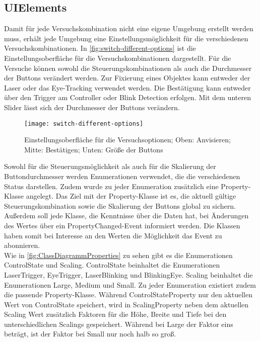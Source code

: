 \subsection{UIElements}
Damit für jede Versuchskombination nicht eine eigene Umgebung erstellt werden muss, erhält jede Umgebung eine Einstellungsmöglichkeit für die verschiedenen Versuchskombinationen. In \autoref{fig:switch-different-options} ist die Einstellungsoberfläche für die Versuchskombinationen dargestellt. Für die Versuche können sowohl die Steuerungskombinationen als auch die Durchmesser der Buttons verändert werden. Zur Fixierung eines Objektes kann entweder der Laser oder das Eye-Tracking verwendet werden. Die Bestätigung kann entweder über den Trigger am Controller oder Blink Detection erfolgen. Mit dem unteren Slider lässt sich der Durchmesser der Buttons verändern. 

\begin{figure}[!htbp]
	\centering
	\texttt{[image: switch-different-options]}
	\caption[Einstellungsoberfläche für die Versuchsoptionen]{Einstellungsoberfläche für die Versuchsoptionen; Oben: Anvisieren; Mitte: Bestätigen; Unten: Größe der Buttons}
	\label{fig:switch-different-options}
\end{figure}

Sowohl für die Steuerungsmöglichkeit als auch für die Skalierung der Buttondurchmesser werden Enumerationen verwendet, die die verschiedenen Status darstellen. Zudem wurde zu jeder Enumeration zusätzlich eine Property-Klasse angelegt. Das Ziel mit der Property-Klasse ist es, die aktuell gültige Steuerungskombination sowie die Skalierung der Buttons global zu sichern. Außerdem soll jede Klasse, die Kenntnisse über die Daten hat, bei Änderungen des Wertes über ein PropertyChanged-Event informiert werden. Die Klassen haben somit bei Interesse an den Werten die Möglichkeit das Event zu abonnieren. \\
Wie in \autoref{fig:ClassDiagrammProperties} zu sehen gibt es die Enumerationen ControlState und Scaling. ControlState beinhaltet die Enumerationen LaserTrigger, EyeTrigger, LaserBlinking und BlinkingEye. Scaling beinhaltet die Enumerationen Large, Medium und Small. Zu jeder Enumeration existiert zudem die passende Property-Klasse. Während ControlStateProperty nur den aktuellen Wert von ControlState speichert, wird in ScalingProperty neben dem aktuellen Scaling Wert zusätzlich Faktoren für die Höhe, Breite und Tiefe bei den unterschiedlichen Scalings gespeichert. Während bei Large der Faktor eins beträgt, ist der Faktor bei Small nur noch halb so groß. 

